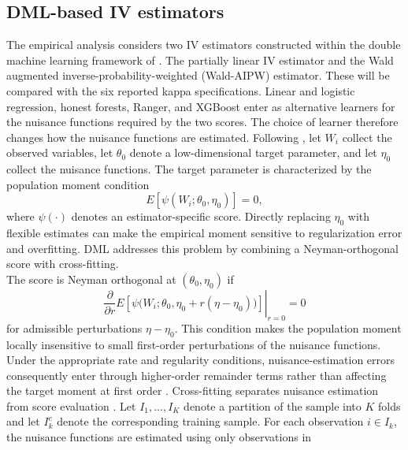 \documentclass[12pt, a4paper, oneside]{article}
\theoremstyle{plain}
\theoremstyle{definition}
\begin{document}
\subsection{DML-based IV estimators}

The empirical analysis considers two IV estimators constructed within the
double machine learning framework of \citet{chernozhukov2018double}.
The
partially linear IV estimator and the Wald augmented inverse-probability-weighted
(Wald-AIPW) estimator. These will be compared with the six
reported kappa specifications. Linear and logistic regression, honest forests,
Ranger, and XGBoost enter as alternative learners for the nuisance functions
required by the two scores. The choice of learner therefore changes how the
nuisance functions are estimated.
Following \citet[Sections~2--3]{chernozhukov2018double}, let $W_i$ collect the observed variables, let $\theta_0$ denote a low-dimensional target parameter, and let $\eta_0$ collect the nuisance functions. The target parameter is characterized by the population moment condition
\begin{equation}
    E\!\left[\psi(W_i;\theta_0,\eta_0)\right]=0,
    \label{eq:dml_moment}
\end{equation}
where $\psi(\cdot)$ denotes an estimator-specific score. Directly replacing $\eta_0$ with flexible estimates can make the empirical moment sensitive to regularization error and overfitting. DML addresses this problem by combining a Neyman-orthogonal score with cross-fitting.\\
The score is Neyman orthogonal at $(\theta_0,\eta_0)$ if
\begin{equation}
    \left.
    \frac{\partial}{\partial r}
    E\!\left[
        \psi\bigl(W_i;\theta_0,\eta_0+r(\eta-\eta_0)\bigr)
    \right]
    \right|_{r=0}
    =0
    \label{eq:neyman_orthogonality}
\end{equation}
for admissible perturbations $\eta-\eta_0$. This condition makes the population moment locally insensitive to small first-order perturbations of the nuisance functions. Under the appropriate rate and regularity conditions, nuisance-estimation errors consequently enter through higher-order remainder terms rather than affecting the target moment at first order \citep{chernozhukov2018double}. 
Cross-fitting separates nuisance estimation from score evaluation
\citep[Section~3]{chernozhukov2018double}. Let
$I_1,\ldots,I_K$ denote a partition of the sample into $K$ folds and let
$I_k^c$ denote the corresponding training sample. For each observation
$i\in I_k$, the nuisance functions are estimated using only observations in
\end{document}
